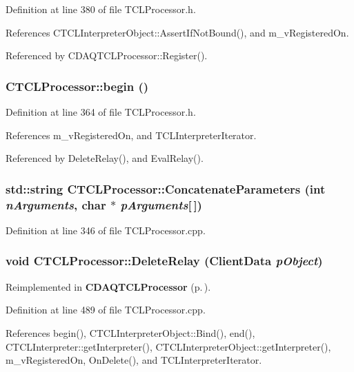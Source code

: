 Definition at line 380 of file TCLProcessor.h.

References CTCLInterpreter\-Object::Assert\-If\-Not\-Bound(), and m\_\-v\-Registered\-On.

Referenced by CDAQTCLProcessor::Register().
\subsubsection{ CTCLProcessor::begin ()\hspace{0.3cm}{\tt  [inline]}}\label{classCTCLProcessor_a5}




Definition at line 364 of file TCLProcessor.h.

References m\_\-v\-Registered\-On, and TCLInterpreter\-Iterator.

Referenced by Delete\-Relay(), and Eval\-Relay().
\subsubsection{\setlength{\rightskip}{0pt plus 5cm}std::string CTCLProcessor::Concatenate\-Parameters (int {\em n\-Arguments}, char $\ast$ {\em p\-Arguments}[$\,$])\hspace{0.3cm}{\tt  [static]}}\label{classCTCLProcessor_d0}




Definition at line 346 of file TCLProcessor.cpp.
\subsubsection{\setlength{\rightskip}{0pt plus 5cm}void CTCLProcessor::Delete\-Relay (Client\-Data {\em p\-Object})\hspace{0.3cm}{\tt  [static]}}\label{classCTCLProcessor_d2}




Reimplemented in {\bf CDAQTCLProcessor} {\rm (p.\,\pageref{classCDAQTCLProcessor_f1})}.

Definition at line 489 of file TCLProcessor.cpp.

References begin(), CTCLInterpreter\-Object::Bind(), end(), CTCLInterpreter::get\-Interpreter(), CTCLInterpreter\-Object::get\-Interpreter(), m\_\-v\-Registered\-On, On\-Delete(), and TCLInterpreter\-Iterator.


